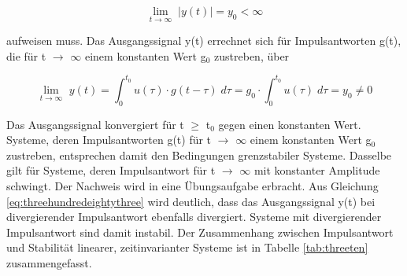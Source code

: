 \begin{equation}\label{eq:threehundredeightyfive}
{\mathop{\lim }\limits_{t\to \infty }} \; \left|y\left(t\right)\right|=y_{0} <\infty 
\end{equation}

\noindent aufweisen muss. Das Ausgangssignal y(t) errechnet sich f\"{u}r Impulsantworten g(t), die f\"{u}r t $\rightarrow$ $\mathrm{\infty}$ einem konstanten Wert g${}_{0}$ zustreben, \"{u}ber 

\begin{equation}\label{eq:threehundredeightysix}
{\mathop{\lim }\limits_{t\to \infty }} \, \, y\left(t\right)=\int _{0}^{t_{0} }u\left(\tau \right)\cdot g\left(t-\tau \right)\;d\tau  =g_{0} \cdot \int _{0}^{t_{0} }u\left(\tau \right)\;d\tau  =y_{0} \ne 0
\end{equation}

\noindent Das Ausgangssignal konvergiert f\"{u}r t $\geq$ t${}_{0}$ gegen einen konstanten Wert. Systeme, deren Impulsantworten g(t) f\"{u}r t $\rightarrow$ $\mathrm{\infty}$ einem konstanten Wert g${}_{0}$ zustreben, entsprechen damit den Bedingungen grenzstabiler Systeme. Dasselbe gilt f\"{u}r Systeme, deren Impulsantwort f\"{u}r t $\rightarrow$ $\mathrm{\infty}$ mit konstanter Amplitude schwingt. Der Nachweis wird in eine \"{U}bungsaufgabe erbracht. Aus Gleichung \eqref{eq:threehundredeightythree} wird deutlich, dass das Ausgangssignal y(t) bei divergierender Impulsantwort ebenfalls divergiert. Systeme mit divergierender Impulsantwort sind damit instabil. Der Zusammenhang zwischen Impulsantwort und Stabilit\"{a}t linearer, zeitinvarianter Systeme ist in Tabelle \ref{tab:threeten} zusammengefasst.

